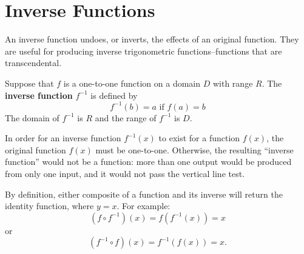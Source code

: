 \section{Inverse Functions}

An inverse function undoes, or inverts, the effects of an original function.
They are useful for producing inverse trigonometric functions--functions that are transcendental.

\begin{defn}
  Suppose that \(f\) is a one-to-one function on a domain $D$ with range $R$. The \textbf{inverse function} $f^{-1}$ is defined by
  \[ f^{-1}(b)=a \text{ if } f(a)=b \]
  The domain of $f^{-1}$ is $R$ and the range of $f^{-1}$ is $D$.
\end{defn}
In order for an inverse function $f^{-1}(x)$ to exist for a function $f(x)$, the original function $f(x)$ must be one-to-one. Otherwise, the resulting ``inverse function'' would not be a function: more than one output would be produced from only one input, and it would not pass the vertical line test.
\begin{figure}[H]
  \begin{center}
  \end{center}
  \label{fig:inversef}
\end{figure}
\begin{remark} 
  By definition, either composite of a function and its inverse will return the identity function, where $y=x$. For example:
  \[ (f \circ f^{-1})(x)=f(f^{-1}(x))=x \]
  or
  \[ (f^{-1} \circ f)(x)=f^{-1}(f(x))=x. \]
\end{remark}

